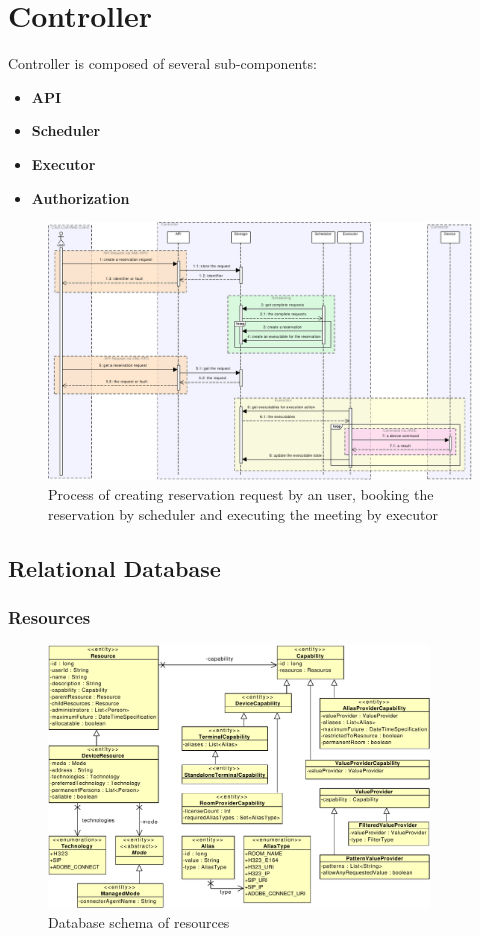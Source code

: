 \chapter{Controller}

Controller is composed of several sub-components:
\begin{itemize}
\item \textbf{API}
\item \textbf{Scheduler}
\item \textbf{Executor}
\item \textbf{Authorization}
\end{itemize}

\begin{figure}[ht!]
\centering\includegraphics[width=\textwidth]{diagrams/sd_reservation_request_processing}
\caption{Process of creating reservation request by an user, booking the reservation by scheduler and executing the meeting by executor}
\label{fig:resources}
\end{figure}

\section{Relational Database}

\subsection{Resources}

\begin{figure}[ht!]
\centering\includegraphics[width=0.9\textwidth]{diagrams/cd_resources}
\caption{Database schema of resources}
\label{fig:resources}
\end{figure}

